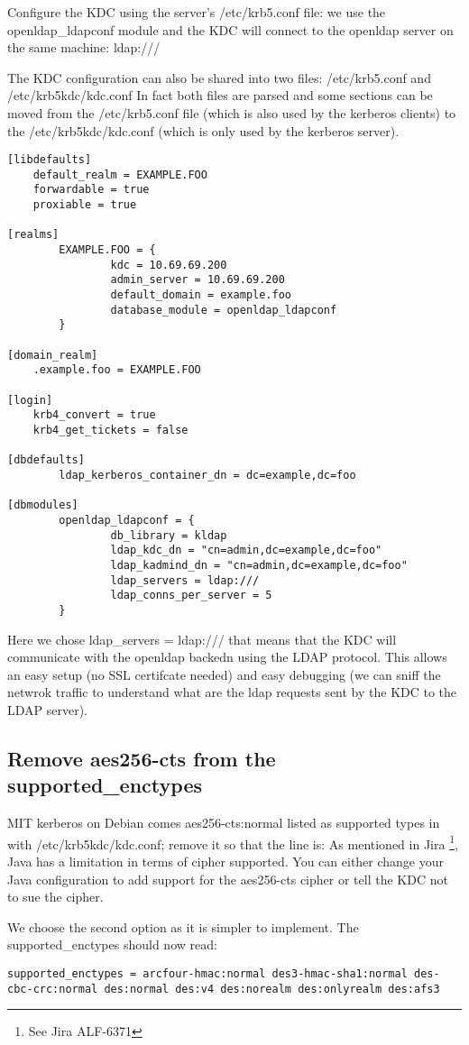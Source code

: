 \documentclass[12pt,a4]{article}
\begin{document}
Configure the KDC using the server's /etc/krb5.conf file: we use the openldap\_ldapconf module and the KDC will connect to the openldap server on the same machine: ldap:///

The KDC configuration can also be shared into two files: /etc/krb5.conf and /etc/krb5kdc/kdc.conf 
In fact both files are parsed and some sections can be moved from the  /etc/krb5.conf file (which is also used by the kerberos clients) to the /etc/krb5kdc/kdc.conf (which is only used by the kerberos server).
\begin{verbatim}
[libdefaults]
	default_realm = EXAMPLE.FOO
	forwardable = true
	proxiable = true

[realms]
        EXAMPLE.FOO = {
                kdc = 10.69.69.200
                admin_server = 10.69.69.200
                default_domain = example.foo
                database_module = openldap_ldapconf
        }

[domain_realm]
	.example.foo = EXAMPLE.FOO

[login]
	krb4_convert = true
	krb4_get_tickets = false

[dbdefaults]
        ldap_kerberos_container_dn = dc=example,dc=foo

[dbmodules]
        openldap_ldapconf = {
                db_library = kldap
                ldap_kdc_dn = "cn=admin,dc=example,dc=foo"
                ldap_kadmind_dn = "cn=admin,dc=example,dc=foo"
                ldap_servers = ldap:/// 
                ldap_conns_per_server = 5
        }
\end{verbatim}
Here we chose ldap\_servers = ldap:/// that means that the KDC will communicate with the openldap backedn using the LDAP protocol. This allows an easy setup (no SSL certifcate needed) and easy debugging (we can sniff the netwrok traffic to understand what are the ldap requests sent by the KDC to the LDAP server).

\subsection{Remove aes256-cts from the supported\_enctypes}
MIT kerberos on Debian comes aes256-cts:normal listed as supported types in with /etc/krb5kdc/kdc.conf; remove it so that the line is:
As mentioned in Jira \footnote{See Jira ALF-6371}, Java has a limitation in terms of cipher supported. You can either change your Java configuration to add support for the aes256-cts cipher or tell the KDC not to sue the cipher. 

We choose the second option as it is simpler to implement. The supported\_enctypes should now read:
\begin{verbatim}
supported_enctypes = arcfour-hmac:normal des3-hmac-sha1:normal des-cbc-crc:normal des:normal des:v4 des:norealm des:onlyrealm des:afs3
\end{verbatim}
\end{document}
